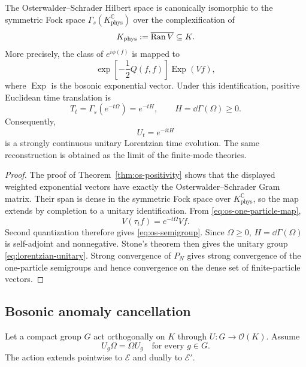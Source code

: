 \begin{theorem}
\label{thm:os-unitarity}
The Osterwalder--Schrader Hilbert space is canonically isomorphic to the symmetric Fock space $\Gamma_s(K_{\mathrm{phys}}^{\mathbb C})$ over the complexification of
\[
K_{\mathrm{phys}}:=\overline{\operatorname{Ran} V}\subseteq K.
\]
More precisely, the class of $e^{i\phi(f)}$ is mapped to
\[
\exp\!\left[-\frac12Q(f,f)\right]\operatorname{Exp}(Vf),
\]
where $\operatorname{Exp}$ is the bosonic exponential vector.  Under this identification, positive Euclidean time translation is
\begin{equation}
T_t=\Gamma_s(e^{-t\Omega})=e^{-tH},
\qquad
H=\dd\Gamma(\Omega)\ge0.
\label{eq:os-semigroup}
\end{equation}
Consequently,
\begin{equation}
U_t=e^{-itH}
\label{eq:lorentzian-unitary}
\end{equation}
is a strongly continuous unitary Lorentzian time evolution.  The same reconstruction is obtained as the limit of the finite-mode theories.
\end{theorem}

\begin{proof}
The proof of Theorem~\ref{thm:os-positivity} shows that the displayed weighted exponential vectors have exactly the Osterwalder--Schrader Gram matrix.  Their span is dense in the symmetric Fock space over $K_{\mathrm{phys}}^{\mathbb C}$, so the map extends by completion to a unitary identification.  From \eqref{eq:os-one-particle-map},
\[
V(\tau_tf)=e^{-t\Omega}Vf.
\]
Second quantization therefore gives \eqref{eq:os-semigroup}.  Since $\Omega\ge0$, $H=\dd\Gamma(\Omega)$ is self-adjoint and nonnegative.  Stone's theorem then gives the unitary group \eqref{eq:lorentzian-unitary}.  Strong convergence of $P_N$ gives strong convergence of the one-particle semigroups and hence convergence on the dense set of finite-particle vectors.
\end{proof}

\subsection{Bosonic anomaly cancellation}

Let a compact group $G$ act orthogonally on $K$ through $U:G\to\mathcal O(K)$.  Assume
\begin{equation}
U_g\Omega=\Omega U_g
\quad\text{for every }g\in G.
\label{eq:symmetry-commutes-omega}
\end{equation}
The action extends pointwise to $\mathscr E$ and dually to $\mathscr E'$.

